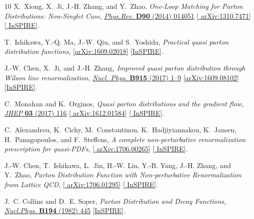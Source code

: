 \begin{thebibliography}{10}
X.~Xiong, X.~Ji, J.-H. Zhang, and Y.~Zhao, {\it {One-Loop Matching for Parton
  Distributions: Non-Singlet Case}},
\href{http://dx.doi.org/10.1103/PhysRevD.90.014051}{{\em Phys.Rev.} {\bfseries
  D90} (2014) 014051} [\href{http://arxiv.org/abs/1310.7471}{{\ttfamily
  arXiv:1310.7471}}] [\href{http://inspirehep.net/record/1262353}{{\ttfamily
  InSPIRE}}].

T.~Ishikawa, Y.-Q. Ma, J.-W. Qiu, and S.~Yoshida,
{\it {Practical quasi parton distribution functions}},
  [\href{http://arxiv.org/abs/1609.02018}{{\ttfamily arXiv:1609.02018}}]
  [\href{http://inspirehep.net/record/1485578}{{\ttfamily InSPIRE}}].

J.-W. Chen, X.~Ji, and J.-H. Zhang, {\it {Improved quasi parton distribution
  through Wilson line renormalization}},
\href{http://dx.doi.org/10.1016/j.nuclphysb.2016.12.004}{{\em Nucl. Phys.}
  {\bfseries B915} (2017) 1--9}
  [\href{http://arxiv.org/abs/1609.08102}{{\ttfamily arXiv:1609.08102}}]
  [\href{http://inspirehep.net/record/1488113}{{\ttfamily InSPIRE}}].

C.~Monahan and K.~Orginos, {\it {Quasi parton distributions and the gradient
  flow}},
\href{http://dx.doi.org/10.1007/JHEP03(2017)116}{{\em JHEP} {\bfseries 03}
  (2017) 116} [\href{http://arxiv.org/abs/1612.01584}{{\ttfamily
  arXiv:1612.01584}}] [\href{http://inspirehep.net/record/1501937}{{\ttfamily
  InSPIRE}}].

C.~Alexandrou, K.~Cichy, M.~Constantinou, K.~Hadjiyiannakou, K.~Jansen,
  H.~Panagopoulos, and F.~Steffens,
{\it {A complete non-perturbative renormalization prescription for
  quasi-PDFs}},  [\href{http://arxiv.org/abs/1706.00265}{{\ttfamily
  arXiv:1706.00265}}] [\href{http://inspirehep.net/record/1602174}{{\ttfamily
  InSPIRE}}].

J.-W. Chen, T.~Ishikawa, L.~Jin, H.-W. Lin, Y.-B. Yang, J.-H. Zhang, and
  Y.~Zhao,
{\it {Parton Distribution Function with Non-perturbative Renormalization from
  Lattice QCD}},  [\href{http://arxiv.org/abs/1706.01295}{{\ttfamily
  arXiv:1706.01295}}] [\href{http://inspirehep.net/record/1602626}{{\ttfamily
  InSPIRE}}].

J.~C. Collins and D.~E. Soper, {\it {Parton Distribution and Decay Functions}},
\href{http://dx.doi.org/10.1016/0550-3213(82)90021-9}{{\em Nucl.Phys.}
  {\bfseries B194} (1982) 445}
  [\href{http://inspirehep.net/record/166064}{{\ttfamily InSPIRE}}].


\end{thebibliography}
